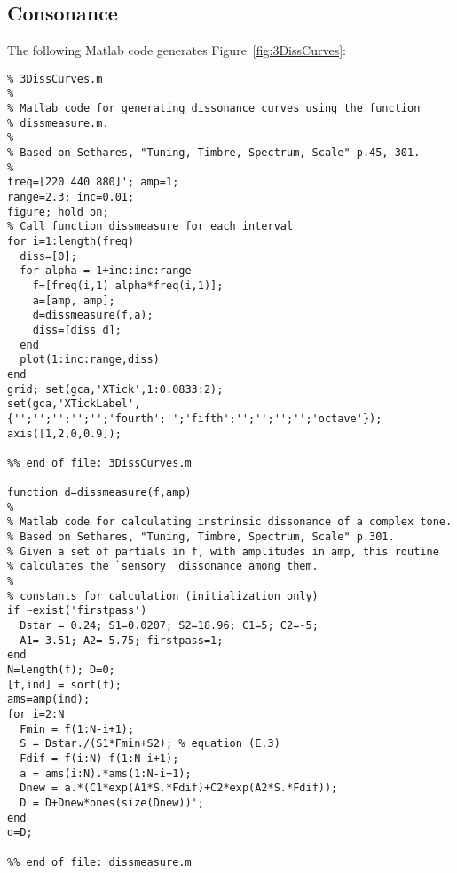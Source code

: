 \subsection{Consonance}\label{sec:3DissCurves}
The following Matlab code generates Figure~\ref{fig:3DissCurves}:
\begin{verbatim}
% 3DissCurves.m
%
% Matlab code for generating dissonance curves using the function
% dissmeasure.m.  
%
% Based on Sethares, "Tuning, Timbre, Spectrum, Scale" p.45, 301.
%
freq=[220 440 880]'; amp=1;
range=2.3; inc=0.01;
figure; hold on;
% Call function dissmeasure for each interval
for i=1:length(freq)
  diss=[0];
  for alpha = 1+inc:inc:range
    f=[freq(i,1) alpha*freq(i,1)];
    a=[amp, amp];
    d=dissmeasure(f,a);
    diss=[diss d];
  end
  plot(1:inc:range,diss)
end
grid; set(gca,'XTick',1:0.0833:2);
set(gca,'XTickLabel',{'';'';'';'';'';'fourth';'';'fifth';'';'';'';'';'octave'});
axis([1,2,0,0.9]);

%% end of file: 3DissCurves.m

function d=dissmeasure(f,amp)
%
% Matlab code for calculating instrinsic dissonance of a complex tone.
% Based on Sethares, "Tuning, Timbre, Spectrum, Scale" p.301.
% Given a set of partials in f, with amplitudes in amp, this routine
% calculates the `sensory' dissonance among them.
%
% constants for calculation (initialization only)
if ~exist('firstpass')
  Dstar = 0.24; S1=0.0207; S2=18.96; C1=5; C2=-5; 
  A1=-3.51; A2=-5.75; firstpass=1; 
end
N=length(f); D=0;
[f,ind] = sort(f);
ams=amp(ind);
for i=2:N
  Fmin = f(1:N-i+1);
  S = Dstar./(S1*Fmin+S2); % equation (E.3)
  Fdif = f(i:N)-f(1:N-i+1);
  a = ams(i:N).*ams(1:N-i+1);
  Dnew = a.*(C1*exp(A1*S.*Fdif)+C2*exp(A2*S.*Fdif));
  D = D+Dnew*ones(size(Dnew))';
end
d=D;

%% end of file: dissmeasure.m
\end{verbatim}
